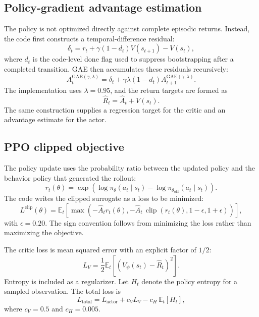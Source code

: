 \documentclass[11pt,a4paper]{article}
\begin{document}
\subsection{Policy-gradient advantage estimation}
The policy is not optimized directly against complete episodic returns. Instead, the code first constructs a temporal-difference residual:
\begin{equation}
\delta_t = r_t + \gamma (1-d_t)V(s_{t+1}) - V(s_t),
\end{equation}
where $d_t$ is the code-level done flag used to suppress bootstrapping after a completed transition. GAE then accumulates these residuals recursively:
\begin{equation}
A_t^{\mathrm{GAE}(\gamma,\lambda)}
= \delta_t + \gamma\lambda(1-d_t)A_{t+1}^{\mathrm{GAE}(\gamma,\lambda)}.
\end{equation}
The implementation uses $\lambda=0.95$, and the return targets are formed as
\begin{equation}
\widehat{R}_t = \widehat{A}_t + V(s_t).
\end{equation}
The same construction supplies a regression target for the critic and an advantage estimate for the actor.

\subsection{PPO clipped objective}
The policy update uses the probability ratio between the updated policy and the behavior policy that generated the rollout:
\begin{equation}
r_t(\theta) = \exp\left(\log\pi_\theta(a_t\mid s_t) - \log\pi_{\theta_{\mathrm{old}}}(a_t\mid s_t)\right).
\end{equation}
The code writes the clipped surrogate as a loss to be minimized:
\begin{equation}
L^{\mathrm{clip}}(\theta)
= \mathbb{E}_t\left[
\max\left(
-\widehat{A}_t r_t(\theta),
-\widehat{A}_t\,\operatorname{clip}\left(r_t(\theta),1-\epsilon,1+\epsilon\right)
\right)
\right],
\end{equation}
with $\epsilon=0.20$. The sign convention follows from minimizing the loss rather than maximizing the objective.

The critic loss is mean squared error with an explicit factor of $1/2$:
\begin{equation}
L_V = \frac{1}{2}\mathbb{E}_t\left[(V_\psi(s_t)-\widehat{R}_t)^2\right].
\end{equation}
Entropy is included as a regularizer. Let $H_t$ denote the policy entropy for a sampled observation. The total loss is
\begin{equation}
L_{\mathrm{total}}
= L_{\mathrm{actor}} + c_V L_V - c_H\,\mathbb{E}_t[H_t],
\end{equation}
where $c_V=0.5$ and $c_H=0.005$.
\end{document}
